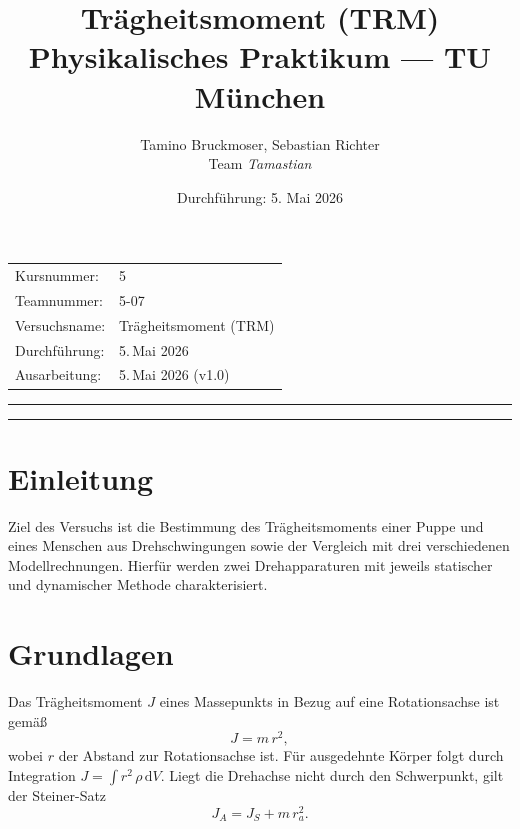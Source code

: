 \documentclass[11pt,a4paper]{article}
\title{\vspace{-1cm}\textbf{Trägheitsmoment (TRM)}\\[2pt]
\large Physikalisches Praktikum --- TU München}
\author{Tamino Bruckmoser, Sebastian Richter \\ Team \emph{Tamastian}}
\date{Durchführung: 5. Mai 2026}
\begin{document}
\maketitle

\noindent
\begin{tabular}{ll}
  Kursnummer:    & 5 \\
  Teamnummer:    & 5-07 \\
  Versuchsname:  & Trägheitsmoment (TRM) \\
  Durchführung:  & 5.\,Mai 2026 \\
  Ausarbeitung:  & 5.\,Mai 2026 (v1.0) \\
\end{tabular}

\vspace{1ex}\hrule\vspace{0.5ex}
\tableofcontents
\vspace{0.5ex}\hrule

\section{Einleitung}
Ziel des Versuchs ist die Bestimmung des Trägheitsmoments einer
Puppe und eines Menschen aus Drehschwingungen sowie der Vergleich
mit drei verschiedenen Modellrechnungen. Hierfür werden zwei
Drehapparaturen mit jeweils statischer und dynamischer Methode
charakterisiert.

\section{Grundlagen}
Das Trägheitsmoment $J$ eines Massepunkts in Bezug auf eine
Rotationsachse ist gemäß \cite{anleitung}
\begin{equation}
  J = m\,r^{2}, \tag{1}
\end{equation}
wobei $r$ der Abstand zur Rotationsachse ist. Für ausgedehnte Körper
folgt durch Integration $J = \int r^{2}\,\rho\,\mathrm{d}V$. Liegt
die Drehachse nicht durch den Schwerpunkt, gilt der Steiner-Satz
\begin{equation}
  J_{A} = J_{S} + m\,r_{a}^{2}. \tag{2}
\end{equation}
\end{document}
